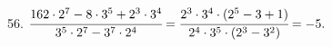 56. $\cfrac{162\cdot2^7-8\cdot3^5+2^3\cdot3^4}{3^5\cdot2^7-3^7\cdot2^4}=
\cfrac{2^3\cdot3^4\cdot(2^5-3+1)}{2^4\cdot3^5\cdot(2^3-3^2)}=-5.$\\
